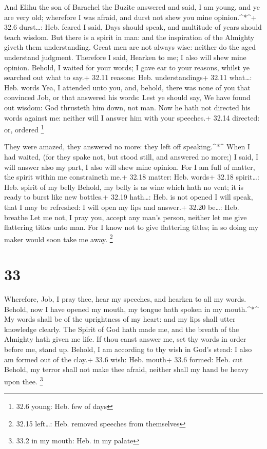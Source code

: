  And Elihu the son of Barachel the Buzite answered and said,
I am young, and ye are very old; wherefore I was afraid, and durst not
shew you mine opinion.\^{}*\^{}+ 32.6 durst\ldots: Heb. feared
 I said, Days should speak, and multitude of years should
teach wisdom.  But there is a spirit in man: and the
inspiration of the Almighty giveth them understanding. 
Great men are not always wise: neither do the aged understand judgment.
 Therefore I said, Hearken to me; I also will shew mine
opinion.  Behold, I waited for your words; I gave ear to
your reasons, whilst ye searched out what to say.+ 32.11 reasons: Heb.
understandings+ 32.11 what\ldots: Heb. words  Yea, I
attended unto you, and, behold, there was none of you that convinced
Job, or that answered his words:  Lest ye should say, We
have found out wisdom: God thrusteth him down, not man. 
Now he hath not directed his words against me: neither will I answer him
with your speeches.+ 32.14 directed: or, ordered \footnote{32.6 young:
  Heb. few of days}

 They were amazed, they answered no more: they left off
speaking.\^{}*\^{}  When I had waited, (for they spake not,
but stood still, and answered no more;)  I said, I will
answer also my part, I also will shew mine opinion.  For I
am full of matter, the spirit within me constraineth me.+ 32.18 matter:
Heb. words+ 32.18 spirit\ldots: Heb. spirit of my belly 
Behold, my belly is as wine which hath no vent; it is ready to burst
like new bottles.+ 32.19 hath\ldots: Heb. is not opened  I
will speak, that I may be refreshed: I will open my lips and answer.+
32.20 be\ldots: Heb. breathe  Let me not, I pray you,
accept any man's person, neither let me give flattering titles unto man.
 For I know not to give flattering titles; in so doing my
maker would soon take me away. \footnote{32.15 left\ldots: Heb. removed
  speeches from themselves}

\hypertarget{section-32}{%
\section{33}\label{section-32}}

 Wherefore, Job, I pray thee, hear my speeches, and hearken
to all my words.  Behold, now I have opened my mouth, my
tongue hath spoken in my mouth.\^{}*\^{}  My words shall be
of the uprightness of my heart: and my lips shall utter knowledge
clearly.  The Spirit of God hath made me, and the breath of
the Almighty hath given me life.  If thou canst answer me,
set thy words in order before me, stand up.  Behold, I am
according to thy wish in God's stead: I also am formed out of the clay.+
33.6 wish: Heb. mouth+ 33.6 formed: Heb. cut  Behold, my
terror shall not make thee afraid, neither shall my hand be heavy upon
thee. \footnote{33.2 in my mouth: Heb. in my palate}

